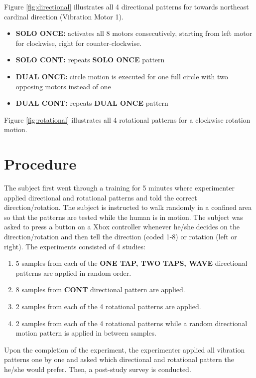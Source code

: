 Figure \ref{fig:directional} illustrates all 4 directional patterns for towards northeast cardinal direction (Vibration Motor 1).

\begin{itemize}
\item{\textbf{SOLO ONCE: } activates all 8 motors consecutively, starting from left motor for clockwise, right  for counter-clockwise.}
\item{\textbf{SOLO CONT: } repeats \textbf{SOLO ONCE} pattern}
\item{\textbf{DUAL ONCE: } circle motion is executed for one full circle with two opposing motors instead of one}
\item{\textbf{DUAL CONT: } repeats \textbf{DUAL ONCE} pattern}
\end{itemize}

Figure \ref{fig:rotational} illustrates all 4 rotational patterns for a clockwise rotation motion. 

\section{Procedure}

The subject first went through a training for 5 minutes where experimenter applied directional and rotational patterns and told the correct direction/rotation. The subject is instructed to walk randomly in a confined area so that the patterns are tested while the human is in motion. The subject was asked to press a button on a Xbox controller whenever he/she decides on the direction/rotation and then tell the direction (coded 1-8) or rotation (left or right). The experiments consisted of 4 studies:

\begin{enumerate}
\item 5 samples from each of the \textbf{ONE TAP, TWO TAPS, WAVE} directional patterns are applied in random order. 
\item 8 samples from \textbf{CONT} directional pattern are applied.
\item 2 samples from each of the 4 rotational patterns are applied.
\item 2 samples from each of the 4 rotational patterns while a random directional motion pattern is applied in between samples.
\end{enumerate}


Upon the completion of the experiment, the experimenter applied all vibration patterns one by one and asked which directional and rotational pattern the he/she would prefer. Then, a post-study survey is conducted.

